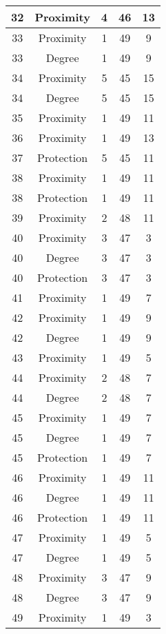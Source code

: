 \documentclass[results.tex]{subfiles}
\begin{document}
\begin{center}
\begin{tabular}{| c || c | c | c | c |}
    32 & Proximity & 4 & 46 & 13 \\ 
    \hline
    33 & Proximity & 1 & 49 & 9 \\ 
    \hline
    33 & Degree & 1 & 49 & 9 \\ 
    \hline
    34 & Proximity & 5 & 45 & 15 \\ 
    \hline
    34 & Degree & 5 & 45 & 15 \\ 
    \hline
    35 & Proximity & 1 & 49 & 11 \\ 
    \hline
    36 & Proximity & 1 & 49 & 13 \\ 
    \hline
    37 & Protection & 5 & 45 & 11 \\ 
    \hline
    38 & Proximity & 1 & 49 & 11 \\ 
    \hline
    38 & Protection & 1 & 49 & 11 \\ 
    \hline
    39 & Proximity & 2 & 48 & 11 \\ 
    \hline
    40 & Proximity & 3 & 47 & 3 \\ 
    \hline
    40 & Degree & 3 & 47 & 3 \\ 
    \hline
    40 & Protection & 3 & 47 & 3 \\ 
    \hline
    41 & Proximity & 1 & 49 & 7 \\ 
    \hline
    42 & Proximity & 1 & 49 & 9 \\ 
    \hline
    42 & Degree & 1 & 49 & 9 \\ 
    \hline
    43 & Proximity & 1 & 49 & 5 \\ 
    \hline
    44 & Proximity & 2 & 48 & 7 \\ 
    \hline
    44 & Degree & 2 & 48 & 7 \\ 
    \hline
    45 & Proximity & 1 & 49 & 7 \\ 
    \hline
    45 & Degree & 1 & 49 & 7 \\ 
    \hline
    45 & Protection & 1 & 49 & 7 \\ 
    \hline
    46 & Proximity & 1 & 49 & 11 \\ 
    \hline
    46 & Degree & 1 & 49 & 11 \\ 
    \hline
    46 & Protection & 1 & 49 & 11 \\ 
    \hline
    47 & Proximity & 1 & 49 & 5 \\ 
    \hline
    47 & Degree & 1 & 49 & 5 \\ 
    \hline
    48 & Proximity & 3 & 47 & 9 \\ 
    \hline
    48 & Degree & 3 & 47 & 9 \\ 
    \hline
    49 & Proximity & 1 & 49 & 3 \\ 
    \hline   \end{tabular}
\end{center}
\end{document}
